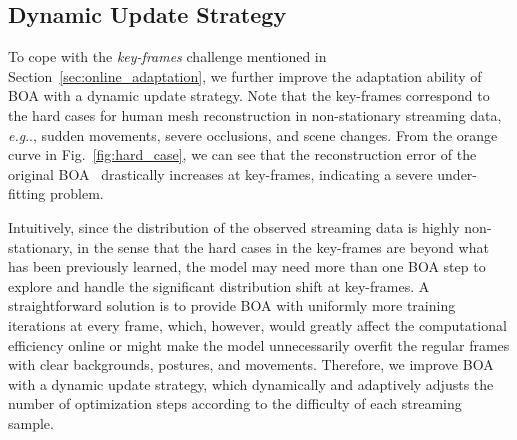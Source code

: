 \documentclass[10pt,journal,compsoc]{IEEEtran}
\makeatletter
\DeclareRobustCommand\onedot{\futurelet\@let@token\@onedot}
\def\@onedot{\ifx\@let@token.\else.\null\fi\xspace}
\def\eg{\emph{e.g}\onedot} \def\Eg{\emph{E.g}\onedot}
\newcommand{\sect}[1]{Section~\ref{#1}}
\newcommand{\fig}[1]{Fig.~\ref{#1}}
\makeatother
\begin{document}
\subsection{Dynamic Update Strategy}
\label{sec:adaptive update}

To cope with the \textit{key-frames} challenge mentioned in \sect{sec:online_adaptation}, we further improve the adaptation ability of BOA with a dynamic update strategy. 
Note that the key-frames correspond to the hard cases for human mesh reconstruction in non-stationary streaming data, \eg, sudden movements, severe occlusions, and scene changes. 
From the orange curve in \fig{fig:hard_case}, we can see that the reconstruction error of the original BOA~\cite{guan2021bilevel} drastically increases at key-frames, indicating a severe under-fitting problem.


Intuitively, since the distribution of the observed streaming data is highly non-stationary, in the sense that the hard cases in the key-frames are beyond what has been previously learned, the model may need more than one BOA step to explore and handle the significant distribution shift at key-frames.
A straightforward solution is to provide BOA with uniformly more training iterations at every frame, which, however, would greatly affect the computational efficiency online or might make the model unnecessarily overfit the regular frames with clear backgrounds, postures, and movements. 
Therefore, we improve BOA with a dynamic update strategy, which dynamically and adaptively adjusts the number of optimization steps according to the difficulty of each streaming sample. 
\end{document}
